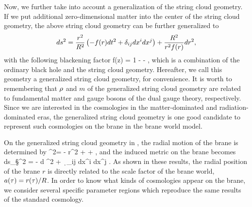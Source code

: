 \documentclass[12pt]{article}
\begin{document}
Now, we further take into account a generalization of the string cloud geometry. If we put additional zero-dimensional matter into the center of the string cloud geometry, the above string cloud geometry can be further generalized to 
\begin{equation}			\la{metric:GStringCloud}
ds^2 = \frac{r^2}{R^2} \left(- f(r) dt^2  + \d_{ij} dx^i dx^j\right)  + \frac{R^2}{r^2 f(r)} dr^2,
\end{equation}
with the following blackening factor
\be
f(z) = 1  -   -      ,
\ee
which is a combination of the ordinary black hole and the string cloud geometry. Hereafter, we call this geometry a generalized string cloud geometry, for convenience. It is worth to remembering that $\rho$ and $m$ of the generalized string cloud geometry are related to fundamental matter and gauge bosons of the dual gauge theory, respectively. Since we are interested in the cosmologies in the matter-dominated and radiation-dominated eras, the generalized string cloud geometry  is one good candidate to represent such cosmologies on the brane in the brane world model.


On the generalized string cloud geometry in , the radial motion of the brane is determined by 
\be		
\ls {} \rs^2=  \ls {}  -  \rs r^2  +    +     ,
\ee
and the induced metric on the brane becomes
\be
ds_\S^2 = - d \ta^2 +    \ \d_{ij} dx^i dx^j  .
\ee
As shown in these results, the radial position of the brane $r$ is directly related to the scale factor of the brane world, $a(\tau) = r(\tau)/R$. In order to know what kinds of cosmologies appear on the brane, we consider several specific parameter regions which reproduce the same results of the standard cosmology.
\end{document}
